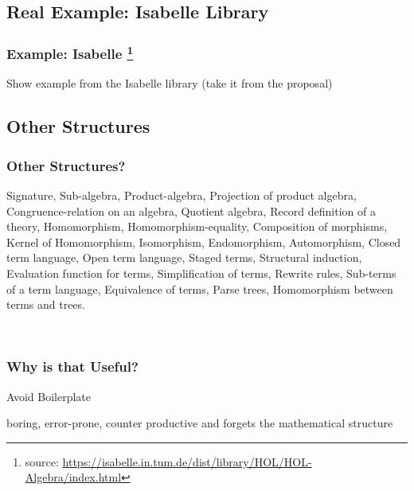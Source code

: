 \documentclass[t,12pt,numbers,fleqn,usenames,xcolor=dvipsnames]{beamer}
\begin{document}
\subsection{Real Example: Isabelle Library}
\begin{frame}
\frametitle{Example: Isabelle \footnote{source: \url{https://isabelle.in.tum.de/dist/library/HOL/HOL-Algebra/index.html}}}
Show example from the Isabelle library (take it from the proposal)
\end{frame}

\subsection{Other Structures}
\begin{frame}
\frametitle{Other Structures?}
\vspace{0.15cm}
{\scriptsize
	Signature, Sub-algebra, Product-algebra, Projection of product algebra, Congruence-relation on 
	an algebra, Quotient algebra, Record definition of a theory, Homomorphism, 
	Homomorphism-equality, Composition of morphisms, Kernel of Homomorphism, Isomorphism, 
	Endomorphism, Automorphism, Closed term language, Open term language, Staged terms, 
	Structural induction, Evaluation function for terms, Simplification of terms, Rewrite rules, 
	Sub-terms of a term language, Equivalence of terms, Parse trees, Homomorphism between 
	terms and trees. 
}

\vspace{0.3cm}
\pause
{}
\
\end{frame}

\begin{frame}
\frametitle{Why is that Useful?}
Avoid Boilerplate 

boring, error-prone, counter productive and forgets the 
	mathematical structure
\end{frame}

\begin{frame}[fragile]
	\begin{center}
	\end{center}
\end{frame}
\end{document}
